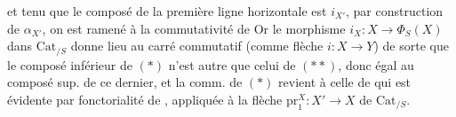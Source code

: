 et  tenu que le composé de la première ligne horizontale est $i_{X'}$, par construction de $\alpha_{X'}$, on est ramené à la commutativité de
Or le morphisme $i_X:X\longrightarrow\Phi_S(X)$ dans $\mathrm{Cat}_{/S}$ donne lieu au carré commutatif (comme  flèche $i:X\longrightarrow Y$)
de sorte que le composé inférieur de $(*)$ n'est autre que celui de $(**)$, donc égal au composé sup. de ce dernier, et la comm. de $(*)$ revient à celle de
qui est évidente par fonctorialité de , appliquée à la flèche $\mathrm{pr}_1^X:X'\longrightarrow X$ de $\mathrm{Cat}_{/S}$.
